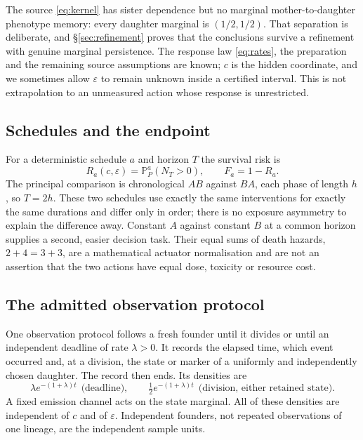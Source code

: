 \documentclass[11pt]{article}
\theoremstyle{plain}
\theoremstyle{definition}
\theoremstyle{remark}
\newcommand{\Prob}{\mathbb P}
\newcommand{\eps}{\varepsilon}
\begin{document}
The source \eqref{eq:kernel} has sister dependence but no marginal
mother-to-daughter phenotype memory: every daughter marginal is $(1/2,1/2)$.
That separation is deliberate, and \S\ref{sec:refinement} proves that the
conclusions survive a refinement with genuine marginal persistence. The
response law \eqref{eq:rates}, the preparation and the remaining source
assumptions are known; $c$ is the hidden coordinate, and we sometimes allow
$\eps$ to remain unknown inside a certified interval. This is not
extrapolation to an unmeasured action whose response is unrestricted.

\subsection{Schedules and the endpoint}

For a deterministic schedule $a$ and horizon $T$ the survival risk is
\begin{equation}\label{eq:risk}
 R_a(c,\eps)=\Prob^a_P(N_T>0),\qquad F_a=1-R_a .
\end{equation}
The principal comparison is chronological $AB$ against $BA$, each phase of
length $h$, so $T=2h$. These two schedules use exactly the same interventions
for exactly the same durations and differ only in order; there is no exposure
asymmetry to explain the difference away. Constant $A$ against constant $B$ at a
common horizon supplies a second, easier decision task. Their equal sums of
death hazards, $2+4=3+3$, are a mathematical actuator normalisation and are not
an assertion that the two actions have equal dose, toxicity or resource cost.

\subsection{The admitted observation protocol}

One observation protocol follows a fresh founder until it divides or until an
independent deadline of rate $\lambda>0$. It records the elapsed time, which
event occurred and, at a division, the state or marker of a uniformly and
independently chosen daughter. The record then ends. Its densities are
\begin{equation}\label{eq:record}
 \lambda e^{-(1+\lambda)t}\ \ \text{(deadline)},\qquad
 \tfrac12 e^{-(1+\lambda)t}\ \ \text{(division, either retained state)} .
\end{equation}
A fixed emission channel acts on the state marginal. All of these densities are
independent of $c$ and of $\eps$. Independent founders, not repeated
observations of one lineage, are the independent sample units.
\end{document}
